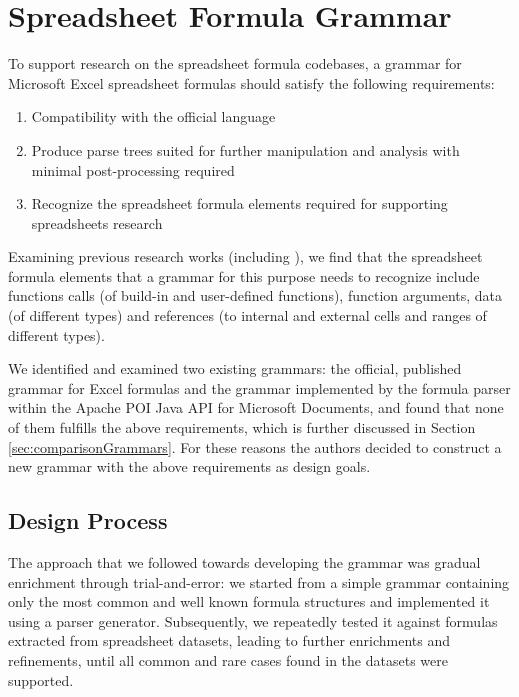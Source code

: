 \documentclass[times]{smrauth}
\begin{document}
\section{Spreadsheet Formula Grammar}
\label{section:grammar}

To support research on the spreadsheet formula codebases, a grammar for Microsoft Excel spreadsheet formulas should satisfy the following requirements:

\label{sec:designgoals}
\begin{enumerate}
	\item Compatibility with the official language
	\item Produce parse trees suited for further manipulation and analysis with minimal post-processing required
	\item Recognize the spreadsheet formula elements required for supporting spreadsheets research
\end{enumerate}
 
Examining previous research works (including \cite{DBLP:conf/icse/HermansPD12, custodes, DouCACheck, hermans2014bumblebee, badame2012refactoring, Expector}), we find that the spreadsheet formula elements that a grammar for this purpose needs to recognize include functions calls (of build-in and user-defined functions), function arguments, data (of different types) and references (to internal and external cells and ranges of different types).

We identified and examined two existing grammars: the official, published grammar for Excel formulas \cite{ExcelOfficialGrammar} and the grammar implemented by the formula parser within the Apache POI Java API for Microsoft Documents, and found that none of them fulfills the above requirements, which is further discussed in Section \ref{sec:comparisonGrammars}. For these reasons the authors decided to construct a new grammar with the above requirements as design goals.

\subsection{Design Process}
\label{sec:designProcess}
The approach that we followed towards developing the grammar was gradual enrichment through trial-and-error: we started from a simple grammar containing only the most common and well known formula structures and implemented it using a parser generator. Subsequently, we repeatedly tested it against formulas extracted from spreadsheet datasets, leading to further enrichments and refinements, until all common and rare cases found in the datasets were supported. 
\end{document}

